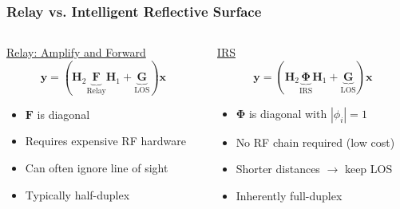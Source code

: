 \documentclass[10pt,tgadventor, onlymath]{beamer}
\begin{document}
\begin{frame}
\frametitle{Relay vs. Intelligent Reflective Surface}
\begin{columns}
\begin{column}{0.5\linewidth}
\centering 
	\underline{Relay: Amplify and Forward}
	\\
	\begin{equation*}
	\mathbf{y} = (\mathbf{H}_2\underbrace{\mathbf{F}}_{\text{Relay}}\mathbf{H}_1 + \underbrace{\mathbf{G}}_{\text{LOS}})\mathbf{x}
	\end{equation*}
	
	\begin{itemize}
	\item 
		$\mathbf{F}$ is diagonal
	\item 
		Requires expensive RF hardware
	\item 
		Can often ignore line of sight
	\item 
		Typically half-duplex
	\end{itemize}
\end{column}
\begin{column}{0.5\linewidth}
\centering 

	\underline{IRS}
	\\
	\begin{equation*}
	\mathbf{y} = (\mathbf{H}_2\underbrace{\boldsymbol{\Phi}}_{\text{IRS}}\mathbf{H}_1 + \underbrace{\mathbf{G}}_{\text{LOS}})\mathbf{x}
	\end{equation*} 
	\begin{itemize}
	\item 
		$\boldsymbol{\Phi}$ is diagonal with $| \phi_i | =1$
	\item 
		No RF chain required (low cost)
	\item
		Shorter distances $\rightarrow$ keep LOS
	\item 
		Inherently full-duplex
	\end{itemize}
\end{column}
\end{columns}

\end{frame}
\end{document}
